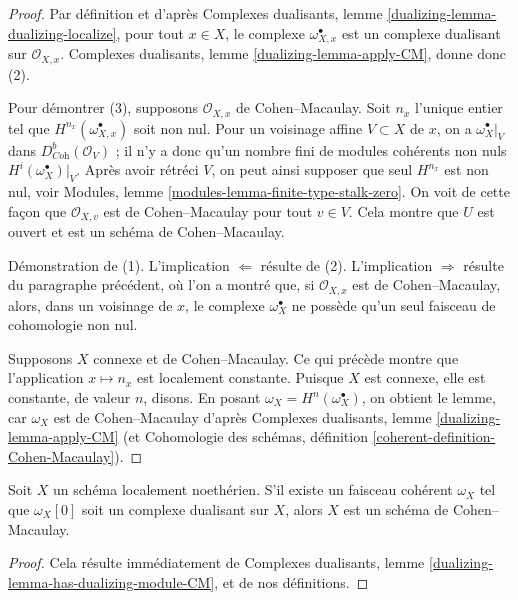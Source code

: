 \begin{proof}
Par définition et d'après Complexes dualisants, lemme \ref{dualizing-lemma-dualizing-localize}, pour tout $x \in X$, le complexe $\omega_{X, x}^\bullet$ est un complexe dualisant sur $\mathcal{O}_{X, x}$. Complexes dualisants, lemme \ref{dualizing-lemma-apply-CM}, donne donc (2).

\medskip\noindent
Pour démontrer (3), supposons $\mathcal{O}_{X, x}$ de Cohen–Macaulay. Soit $n_x$ l'unique entier tel que $H^{n_{x}}(\omega_{X, x}^\bullet)$ soit non nul. Pour un voisinage affine $V \subset X$ de $x$, on a $\omega_X^\bullet|_V$ dans $D^b_{\textit{Coh}}(\mathcal{O}_V)$ ; il n'y a donc qu'un nombre fini de modules cohérents non nuls $H^i(\omega_X^\bullet)|_V$. Après avoir rétréci $V$, on peut ainsi supposer que seul $H^{n_x}$ est non nul, voir Modules, lemme \ref{modules-lemma-finite-type-stalk-zero}. On voit de cette façon que $\mathcal{O}_{X, v}$ est de Cohen–Macaulay pour tout $v \in V$. Cela montre que $U$ est ouvert et est un schéma de Cohen–Macaulay.

\medskip\noindent
Démonstration de (1). L'implication $\Leftarrow$ résulte de (2). L'implication $\Rightarrow$ résulte du paragraphe précédent, où l'on a montré que, si $\mathcal{O}_{X, x}$ est de Cohen–Macaulay, alors, dans un voisinage de $x$, le complexe $\omega_X^\bullet$ ne possède qu'un seul faisceau de cohomologie non nul.

\medskip\noindent
Supposons $X$ connexe et de Cohen–Macaulay. Ce qui précède montre que l'application $x \mapsto n_x$ est localement constante. Puisque $X$ est connexe, elle est constante, de valeur $n$, disons. En posant $\omega_X = H^n(\omega_X^\bullet)$, on obtient le lemme, car $\omega_X$ est de Cohen–Macaulay d'après Complexes dualisants, lemme \ref{dualizing-lemma-apply-CM} (et Cohomologie des schémas, définition \ref{coherent-definition-Cohen-Macaulay}).
\end{proof}

\begin{lemma}
\label{lemma-has-dualizing-module-CM-scheme}
Soit $X$ un schéma localement noethérien. S'il existe un faisceau cohérent $\omega_X$ tel que $\omega_X[0]$ soit un complexe dualisant sur $X$, alors $X$ est un schéma de Cohen–Macaulay.
\end{lemma}

\begin{proof}
Cela résulte immédiatement de Complexes dualisants, lemme \ref{dualizing-lemma-has-dualizing-module-CM}, et de nos définitions.
\end{proof}

